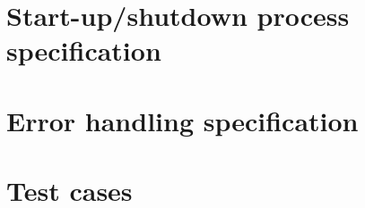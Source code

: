 \section{Start-up/shutdown process specification}
\label{sec:startup-shutdown}

\section{Error handling specification}
\label{sec:error-handling-specification}
%
%

\section{Test cases}
\label{sec:sw-test-cases}

